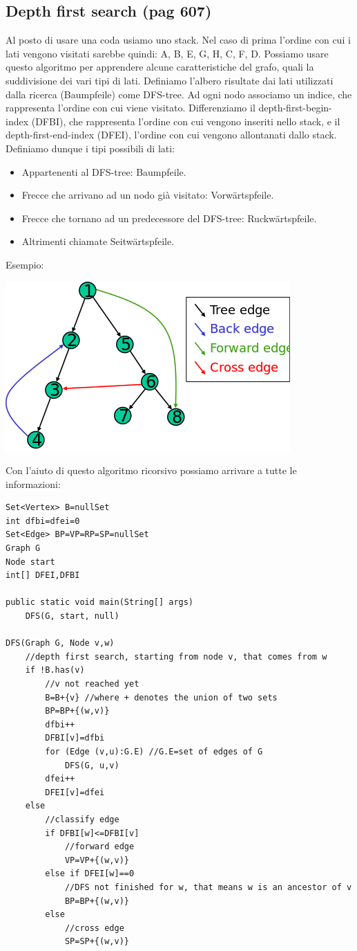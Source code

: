 \documentclass[a4paper]{book}
\newcommand{\lstIndent}{4}
\begin{document}
\subsection{Depth first search (pag 607)}
Al posto di usare una coda usiamo uno stack. Nel caso di prima l'ordine con cui i lati vengono visitati sarebbe quindi: A, B, E, G, H, C, F, D. Possiamo usare questo algoritmo per apprendere alcune caratteristiche del grafo, quali la suddivisione dei vari tipi di lati. Definiamo l'albero risultate dai lati utilizzati dalla ricerca (Baumpfeile) come DFS-tree. Ad ogni nodo associamo un indice, che rappresenta l'ordine con cui viene visitato. Differenziamo il depth-first-begin-index (DFBI), che rappresenta l'ordine con cui vengono inseriti nello stack, e il depth-first-end-index (DFEI), l'ordine con cui vengono allontanati dallo stack. Definiamo dunque i tipi possibili di lati:
\begin{itemize}
\item Appartenenti al DFS-tree: Baumpfeile.
\item Frecce che arrivano ad un nodo già visitato: Vorwärtspfeile.
\item Frecce che tornano ad un predecessore del DFS-tree: Ruckwärtspfeile.
\item Altrimenti chiamate Seitwärtspfeile.
\end{itemize}
Esempio:
\begin{center}
\includegraphics[scale=0.7]{Figures/edgetype.png}
\end{center}
Con l'aiuto di questo algoritmo ricorsivo possiamo arrivare a tutte le informazioni:
\begin{lstlisting}[tabsize=\lstIndent]
Set<Vertex> B=nullSet
int dfbi=dfei=0
Set<Edge> BP=VP=RP=SP=nullSet
Graph G
Node start
int[] DFEI,DFBI

public static void main(String[] args)
	DFS(G, start, null)

DFS(Graph G, Node v,w)
	//depth first search, starting from node v, that comes from w
	if !B.has(v)
		//v not reached yet
		B=B+{v} //where + denotes the union of two sets
		BP=BP+{(w,v)}
		dfbi++
		DFBI[v]=dfbi
		for (Edge (v,u):G.E) //G.E=set of edges of G
			DFS(G, u,v)
		dfei++
		DFEI[v]=dfei
	else
		//classify edge
		if DFBI[w]<=DFBI[v]
			//forward edge
			VP=VP+{(w,v)}
		else if DFEI[w]==0 
			//DFS not finished for w, that means w is an ancestor of v
			BP=BP+{(w,v)}
		else
			//cross edge
			SP=SP+{(w,v)}			
\end{lstlisting}
\end{document}

